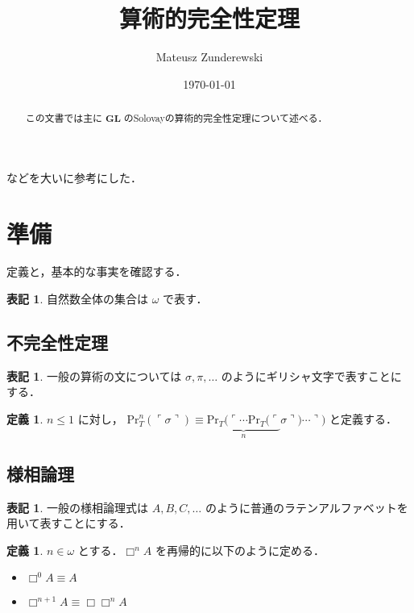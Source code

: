 \documentclass{jsarticle}
\title{算術的完全性定理}
\author{Mateusz Zunderewski}
\date{\today}
\newcommand*{\Logic}[1]{\mathbf{#1}}
\newcommand*{\LogicGL}{\Logic{GL}}
\newcommand*{\Provable}{\mathrm{Pr}}
\theoremstyle{definition}
\newtheorem{definition}[theorem]{定義}
\newtheorem{notation}[theorem]{表記}
\begin{document}
\maketitle

\begin{abstract}
	この文書では主に $\LogicGL$ のSolovayの算術的完全性定理について述べる．
\end{abstract}

\setcounter{tocdepth}{3}
\tableofcontents

\pagebreak

\cite{数学基礎論増補版,数学における証明と真理}などを大いに参考にした．

\section{準備}

定義と，基本的な事実を確認する．

\begin{notation}
	自然数全体の集合は $\omega$ で表す．
\end{notation}

\subsection{不完全性定理}

\begin{notation}
	一般の算術の文については $\sigma, \pi, \dots$ のようにギリシャ文字で表すことにする．
\end{notation}

\begin{definition}
	$n \leq 1$ に対し，
	$\Provable_T^n(\ulcorner \sigma \urcorner) \equiv \underbrace{\Provable_T(\ulcorner \cdots \Provable_T(\ulcorner}_{n} \sigma \urcorner) \cdots \urcorner)$ と定義する．
\end{definition}


\subsection{様相論理}

\begin{notation}
	一般の様相論理式は $A,B,C,\dots$ のように普通のラテンアルファベットを用いて表すことにする．
\end{notation}

\begin{definition}
	$n \in \omega$ とする．$\Box^n A$ を再帰的に以下のように定める．
	\begin{itemize}
		\item $\Box^0 A \equiv A$
		\item $\Box^{n+1} A \equiv \Box \Box^n A$
	\end{itemize}
\end{definition}
\end{document}
